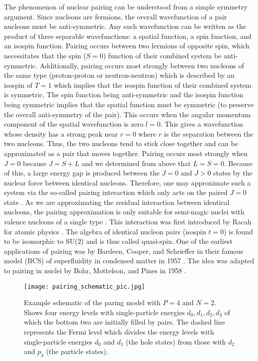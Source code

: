 \documentclass[10pt]{article}
\begin{document}
The phenomenon of nuclear pairing can be understood from a simple symmetry argument. Since nucleons are fermions, the overall wavefunction of a pair nucleons must be anti-symmetric. Any such wavefunction can be written as the product of three separable wavefunctions: a spatial function, a spin function, and an isospin function. Pairing occurs between two fermions of opposite spin, which necessitates that the spin ($S=0$) function of their combined system be anti-symmetric. Additionally, pairing occurs most strongly between two nucleons of the same type (proton-proton or neutron-neutron) which is described by an isospin of $T=1$ which implies that the isospin function of their combined system is symmetric. The spin function being anti-symmetric and the isospin function being symmetric implies that the spatial function must be symmetric (to preserve the overall anti-symmetry of the pair). This occurs when the angular momentum component of the spatial wavefunction is zero $l=0$. This gives a wavefunction whose density has a strong peak near $r=0$ where $r$ is the separation between the two nucleons. Thus, the two nucleons tend to stick close together and can be approximated as a pair that moves together. Pairing occurs most strongly when $J=0$ because $J=S+L$ and we determined from above that $L=S=0$. Because of this, a large energy gap is produced between the $J=0$ and $J>0$ states by the nuclear force between identical nucleons. Therefore, one may approximate such a system via the so-called pairing interaction which only acts on the paired $J=0$ state \cite{ref:dean}. As we are approximating the residual interaction between identical nucleons, the pairing approximation is only suitable for semi-magic nuclei with valence nucleons of a single type \cite{ref:scholar}. This interaction was first introduced by Racah for atomic physics \cite{ref:racah}. The algebra of identical nucleon pairs (isospin $t=0$) is found to be isomorphic to SU(2) and is thus called quasi-spin. One of the earliest applications of pairing was by Bardeen, Cooper, and Schrieffer in their famous model (BCS) of superfluidity in condensed matter in 1957 \cite{ref:bcs}. The idea was adapted to pairing in nuclei by Bohr, Mottelson, and Pines in 1958 \cite{ref:bmp}.

\begin{figure}
    \centering
    \texttt{[image: pairing\_schematic\_pic.jpg]}
    \caption{Example schematic of the paring model with $P=4$ and $N=2$. Shows four energy levels with single-particle energies $d_0,d_1,d_2,d_3$ of which the bottom two are initially filled by pairs. The dashed line represents the Fermi level which divides the energy levels with single-particle energies $d_0$ and $d_1$ (the hole states) from those with $d_2$ and $p_3$ (the particle states).}
    \label{fig:pairing_schem}
\end{figure}
\end{document}

